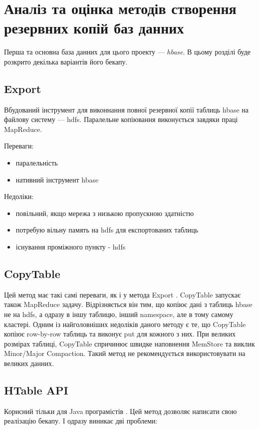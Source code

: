 
\chapter{Аналіз та оцінка методів створення резервних копій баз данних}

Перша та основна база данних для цього проекту --- \textit{hbase}. В цьому розділі буде розкрито декілька варіантів його бекапу.

\section{Export}
Вбудований інструмент для виконнання повної резервної копії таблиць hbase на файлову систему --- hdfs.
Паралельне копіювання виконується завдяки праці MapReduce.

Переваги:

\begin{itemize}
    \item паралельність
    \item нативний інструмент hbase
\end{itemize}

Недоліки:

\begin{itemize}
    \item повільний, якщо мережа з низькою пропускною здатністю
    \item потребую вільну память на hdfs для експортованих таблиць
    \item існування проміжного пункту - hdfs
\end{itemize}

\section{CopyTable}
Цей метод має такі самі переваги, як і у метода Export \cite{hbase2012backup}. CopyTable запускає також MapReduce задачу.
Відрізняється він тим, що копіює дані з таблиць hbase не на hdfs, а одразу в іншу таблицю, 
інший namespace, але в тому самому кластері. Одним із найголовніших недоліків даного методу є те, що CopyTable
копіює row-by-row таблиць та виконує put для кожного з них. 
При великих розмірах таблиці, CopyTable спричинює швидке наповнення MemStore та виклик Minor/Major Compaction.
Такий метод не рекомендується використовувати на великих данних.

\section{HTable API}
Корисний тільки для Java програмістів \cite{hbase2016htable}.
Цей метод дозволяє написати свою реалізацію бекапу.
І одразу виникає дві проблеми:

